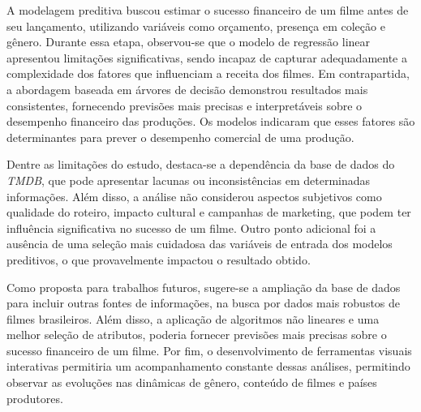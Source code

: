 A modelagem preditiva buscou estimar o sucesso financeiro de um filme antes de seu lançamento, utilizando variáveis como orçamento, presença em coleção e gênero. Durante essa etapa, observou-se que o modelo de regressão linear apresentou limitações significativas, sendo incapaz de capturar adequadamente a complexidade dos fatores que influenciam a receita dos filmes. Em contrapartida, a abordagem baseada em árvores de decisão demonstrou resultados mais consistentes, fornecendo previsões mais precisas e interpretáveis sobre o desempenho financeiro das produções. Os modelos indicaram que esses fatores são determinantes para prever o desempenho comercial de uma produção.

Dentre as limitações do estudo, destaca-se a dependência da base de dados do \textit{\acrshort{TMDB}}, que pode apresentar lacunas ou inconsistências em determinadas informações. Além disso, a análise não considerou aspectos subjetivos como qualidade do roteiro, impacto cultural e campanhas de marketing, que podem ter influência significativa no sucesso de um filme. Outro ponto adicional foi a ausência de uma seleção mais cuidadosa das variáveis de entrada dos modelos preditivos, o que provavelmente impactou o resultado obtido.

Como proposta para trabalhos futuros, sugere-se a ampliação da base de dados para incluir outras fontes de informações, na busca por dados mais robustos de filmes brasileiros. Além disso, a aplicação de algoritmos não lineares e uma melhor seleção de atributos, poderia fornecer previsões mais precisas sobre o sucesso financeiro de um filme. Por fim, o desenvolvimento de ferramentas visuais interativas permitiria um acompanhamento constante dessas análises, permitindo observar as evoluções nas dinâmicas de gênero, conteúdo de filmes e países produtores.